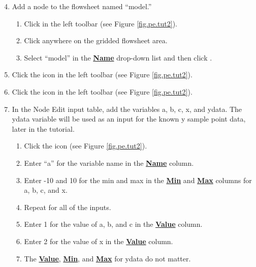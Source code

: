 \begin{enumerate}
	\setcounter{enumi}{3}
	\item Add a node to the flowsheet named ``model.''
	\begin{enumerate}
		\item Click  in the left toolbar (see Figure \ref{fig.pe.tut2}).
		\item Click anywhere on the gridded flowsheet area.
		\item Select ``model'' in the \textbf{\underline{Name}} drop-down list and then click .
	\end{enumerate}
	\item Click the  icon in the left toolbar (see Figure \ref{fig.pe.tut2}).
	\item Click the  icon in the left toolbar (see Figure \ref{fig.pe.tut2}).
	\item In the Node Edit input table, add the variables a, b, c, x, and ydata. The ydata variable will be used as an input for the known y sample point data, later in the tutorial.
	\begin{enumerate}
		\item Click the  icon  (see Figure \ref{fig.pe.tut2}).
		\item Enter ``a'' for the variable name in the \textbf{\underline{Name}} column.
		\item Enter -10 and 10 for the min and max in the \textbf{\underline{Min}} and \textbf{\underline{Max}} columns for a, b, c, and x.
		\item Repeat for all of the inputs.
		\item Enter 1 for the value of a, b, and c in the \textbf{\underline{Value}} column.
		\item Enter 2 for the value of x in the \textbf{\underline{Value}} column.
		\item The \textbf{\underline{Value}}, \textbf{\underline{Min}}, and \textbf{\underline{Max}} for ydata do not matter.
	\end{enumerate}
\end{enumerate}




